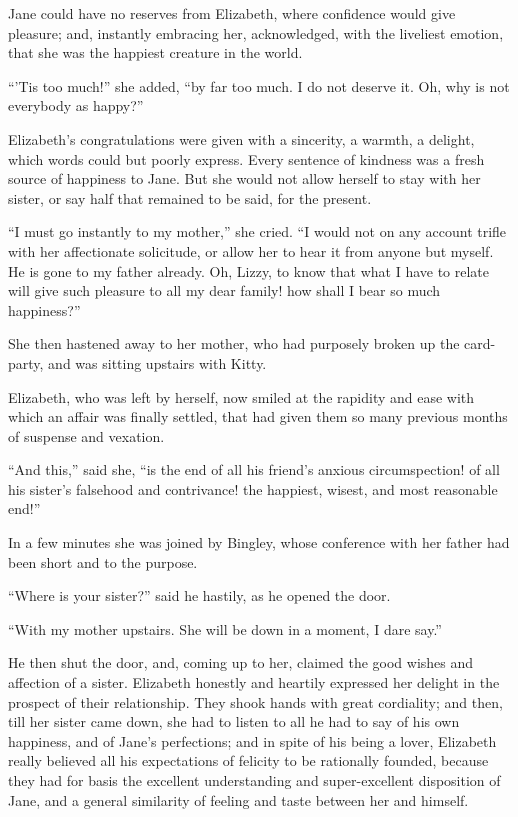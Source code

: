 \documentclass[12pt]{book}
\begin{document}
Jane could have no reserves from Elizabeth, where confidence would give pleasure; and, instantly embracing her, acknowledged, with the liveliest emotion, that she was the happiest creature in the world.

``'Tis too much!'' she added, ``by far too much. I do not deserve it. Oh, why is not everybody as happy?''

Elizabeth's congratulations were given with a sincerity, a warmth, a delight, which words could but poorly express. Every sentence of kindness was a fresh source of happiness to Jane. But she would not allow herself to stay with her sister, or say half that remained to be said, for the present.

``I must go instantly to my mother,'' she cried. ``I would not on any account trifle with her affectionate solicitude, or allow her to hear it from anyone but myself. He is gone to my father already. Oh, Lizzy, to know that what I have to relate will give such pleasure to all my dear family! how shall I bear so much happiness?''

She then hastened away to her mother, who had purposely broken up the card-party, and was sitting upstairs with Kitty.

Elizabeth, who was left by herself, now smiled at the rapidity and ease with which an affair was finally settled, that had given them so many previous months of suspense and vexation.

``And this,'' said she, ``is the end of all his friend's anxious circumspection! of all his sister's falsehood and contrivance! the happiest, wisest, and most reasonable end!''

In a few minutes she was joined by Bingley, whose conference with her father had been short and to the purpose.

``Where is your sister?'' said he hastily, as he opened the door.

``With my mother upstairs. She will be down in a moment, I dare say.''

He then shut the door, and, coming up to her, claimed the good wishes and affection of a sister. Elizabeth honestly and heartily expressed her delight in the prospect of their relationship. They shook hands with great cordiality; and then, till her sister came down, she had to listen to all he had to say of his own happiness, and of Jane's perfections; and in spite of his being a lover, Elizabeth really believed all his expectations of felicity to be rationally founded, because they had for basis the excellent understanding and super-excellent disposition of Jane, and a general similarity of feeling and taste between her and himself.
\end{document}

